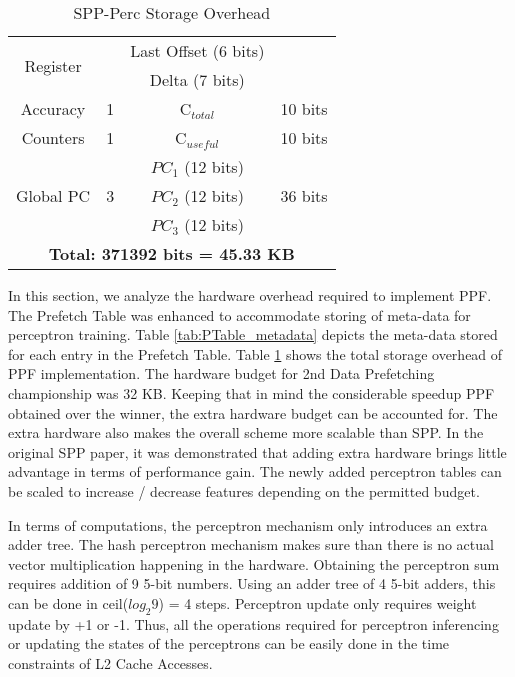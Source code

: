 \begin{table}[]
\begin{tabular}{|c|c|c|c|}
        \multirow{2}{1.2cm}{Register}               &                        & Last Offset (6 bits) &                               \\
                                                    &                        & Delta (7 bits)       &                               \\
    \hline
        Accuracy        & 1     & C$_{total}$       & 10 bits   \\
        Counters        & 1     & C$_{useful}$      & 10 bits   \\
    \hline
        \multirow{3}{1.5cm}{Global PC\newline}      &       & $PC_1$ (12 bits)      &           \\
        \multirow{2}{1.5cm}{~Trackers}              & 3     & $PC_2$ (12 bits)      & 36 bits   \\
                                                    &       & $PC_3$ (12 bits)      &           \\
    \hline
        \multicolumn{4}{|c|}{\textbf{Total: 371392 bits = 45.33 KB}}\\
    \hline
    \end{tabular}
    \caption{SPP-Perc Storage Overhead}
    \label{tab:PPF_overhead}
\end{table}


In this section, we analyze the hardware overhead required to
implement PPF.  The Prefetch Table was enhanced to accommodate
storing of meta-data for perceptron training.  Table
\ref{tab:PTable_metadata} depicts the meta-data stored for each entry in
the Prefetch Table.  Table \ref{tab:PPF_overhead} shows the total
storage overhead of PPF implementation.  The hardware budget for
2nd Data Prefetching championship was 32 KB.  Keeping that in mind 
the considerable speedup PPF obtained over the winner, the extra hardware
budget can be accounted for.  The extra hardware also makes the
overall scheme more scalable than SPP.  In the original SPP paper, it
was demonstrated that adding extra hardware brings little advantage in
terms of performance gain.  The newly added perceptron tables can be
scaled to increase / decrease features depending on the permitted
budget.

In terms of computations, the perceptron mechanism only introduces an
extra adder tree.  The hash perceptron mechanism makes sure than there
is no actual vector multiplication happening in the hardware.
Obtaining the perceptron sum requires addition of 9 5-bit numbers.
Using an adder tree of 4 5-bit adders, this can be done in
ceil($log_{2}9$) = 4 steps.  Perceptron update only requires weight
update by +1 or -1.  Thus, all the operations required for perceptron
inferencing or updating the states of the perceptrons can be
easily done in the time constraints of L2 Cache Accesses.

